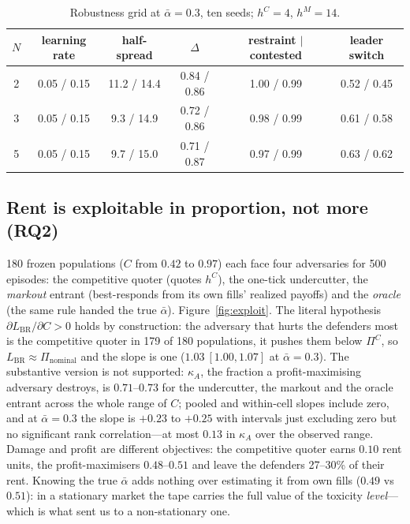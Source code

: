 \documentclass[10pt]{article}
\begin{document}
\begin{table}[h]\footnotesize\centering
\begin{tabular}{cccccc}
\toprule
$N$ & learning rate & half-spread & $\Delta$ & restraint $\mid$ contested & leader switch \\
\midrule
2 & 0.05 / 0.15 & 11.2 / 14.4 & 0.84 / 0.86 & 1.00 / 0.99 & 0.52 / 0.45 \\
3 & 0.05 / 0.15 & 9.3 / 14.9 & 0.72 / 0.86 & 0.98 / 0.99 & 0.61 / 0.58 \\
5 & 0.05 / 0.15 & 9.7 / 15.0 & 0.71 / 0.87 & 0.97 / 0.99 & 0.63 / 0.62 \\
\bottomrule
\end{tabular}
\caption{Robustness grid at $\bar\alpha=0.3$, ten seeds; $h^C=4$, $h^M=14$.}\label{tab:robust}
\end{table}

\subsection{Rent is exploitable in proportion, not more (RQ2)}\label{sec:r2}
180 frozen populations ($C$ from $0.42$ to $0.97$) each face four adversaries for 500 episodes: the competitive quoter (quotes $h^C$), the one-tick undercutter, the \emph{markout} entrant (best-responds from its own fills' realized payoffs) and the \emph{oracle} (the same rule handed the true $\bar\alpha$). Figure~\ref{fig:exploit}. The literal hypothesis $\partial L_{\mathrm{BR}}/\partial C>0$ holds by construction: the adversary that hurts the defenders most is the competitive quoter in 179 of 180 populations, it pushes them below $\Pi^C$, so $L_{\mathrm{BR}}\approx\Pi_{\mathrm{nominal}}$ and the slope is one ($1.03\ [1.00,1.07]$ at $\bar\alpha=0.3$). The substantive version is not supported: $\kappa_A$, the fraction a profit-maximising adversary destroys, is $0.71$--$0.73$ for the undercutter, the markout and the oracle entrant across the whole range of $C$; pooled and within-cell slopes include zero, and at $\bar\alpha=0.3$ the slope is $+0.23$ to $+0.25$ with intervals just excluding zero but no significant rank correlation---at most $0.13$ in $\kappa_A$ over the observed range. Damage and profit are different objectives: the competitive quoter earns $0.10$ rent units, the profit-maximisers $0.48$--$0.51$ and leave the defenders 27--30\% of their rent. Knowing the true $\bar\alpha$ adds nothing over estimating it from own fills ($0.49$ vs $0.51$): in a stationary market the tape carries the full value of the toxicity \emph{level}---which is what sent us to a non-stationary one.
\end{document}
